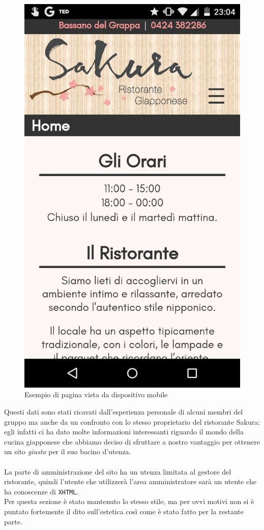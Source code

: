 \documentclass[../relazione.tex]{subfiles}
\begin{document}
		\begin{figure}[H]
			\centering
			\includegraphics[scale=0.15]{images/mobile1}
			\caption{Esempio di pagina vista da dispositivo mobile}
			\label{fig:Esempio di pagina vista da dispositivo mobile}
		\end{figure}
		Questi dati sono stati ricavati dall'esperienza personale di alcuni membri del gruppo ma anche da un confronto con lo stesso proprietario del ristorante Sakura: egli infatti ci ha dato molte informazioni interessanti riguardo il mondo della cucina giapponese che abbiamo deciso di sfruttare a nostro vantaggio per ottenere un sito \textit{giusto} per il suo bacino d'utenza.\\\\
		La parte di amministrazione del sito ha un utenza limitata al gestore del ristorante, quindi l'utente che utilizzerà l'area amministratore sarà un utente che ha conoscenze di \texttt{XHTML}.\\
		Per questa sezione è stato mantenuto lo stesso stile, ma per ovvi motivi non si è puntato fortemente il dito sull'estetica così come è stato fatto per la restante parte. 
\end{document}
